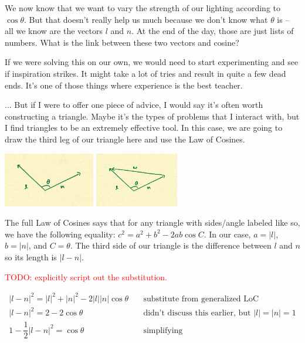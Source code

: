 \documentclass{article}
\newcommand\todo[1]{\textcolor{red}{TODO: #1}}
\begin{document}
We now know that we want to vary the strength of our lighting according to $\cos \theta$.
But that doesn't really help us much because we don't know what $\theta$ is -- all we know are the vectors $l$ and $n$.
At the end of the day, those are just lists of numbers.
What is the link between these two vectors and cosine?

If we were solving this on our own, we would need to start experimenting and see if inspiration strikes.
It might take a lot of tries and result in quite a few dead ends.
It's one of those things where experience is the best teacher.

... But if I were to offer one piece of advice, I would say it's often worth constructing a triangle.
Maybe it's the types of problems that I interact with, but I find triangles to be an extremely effective tool.
In this case, we are going to draw the third leg of our triangle here and use the Law of Cosines.

\begin{center}
	\includegraphics[width=0.3\textwidth,frame]{assets/ln.jpg}
	\hspace{0.2\textwidth}
	\includegraphics[width=0.2735\textwidth,frame]{assets/lnw.jpg}
\end{center}

The full Law of Cosines says that for any triangle with sides/angle labeled like so, we have the following equality: $c^2 = a^2 + b^2 - 2ab \cos C$.
In our case, $a = |l|$, $b = |n|$, and $C = \theta$.
The third side of our triangle is the difference between $l$ and $n$ so its length is $| l - n |$.

\todo{explicitly script out the substitution.}

\begin{align*}
|l-n|^2 = |l|^2 + |n|^2 - 2 |l| |n| \cos \theta & \quad \text{substitute from generalized LoC} \\
|l-n|^2 = 2 - 2 \cos \theta & \quad \text{didn't discuss this earlier, but } |l| = |n| = 1 \\
1 - \dfrac{1}{2}|l-n|^2 = \cos \theta & \quad \text{simplifying}
\end{align*}
\end{document}
